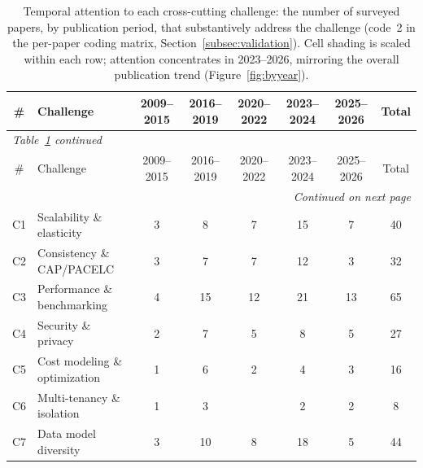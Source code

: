 \documentclass[a4paper,fleqn]{cas-sc}
\begin{document}
\begin{landscape}
\setlength{\LTcapwidth}{\linewidth}
\begin{small}
\begin{longtable}{c >{\raggedright\arraybackslash}p{4.6cm} *{5}{c} c}
\caption{Temporal attention to each cross-cutting challenge: the number of surveyed papers, by publication period, that substantively address the challenge (code~2 in the per-paper coding matrix, Section~\ref{subsec:validation}). Cell shading is scaled within each row; attention concentrates in 2023--2026, mirroring the overall publication trend (Figure~\ref{fig:byyear}).}
\label{tab:challenge-year}\\
\toprule
\# & Challenge & 2009--2015 & 2016--2019 & 2020--2022 & 2023--2024 & 2025--2026 & Total \\
\midrule
\endfirsthead
\multicolumn{8}{l}{\small\textit{Table~\ref{tab:challenge-year} continued}}\\
\toprule
\# & Challenge & 2009--2015 & 2016--2019 & 2020--2022 & 2023--2024 & 2025--2026 & Total \\
\midrule
\endhead
\midrule
\multicolumn{8}{r}{\small\textit{Continued on next page}}\\
\endfoot
\bottomrule
\endlastfoot
C1 & Scalability \& elasticity & \cellcolor{cgray!32}3 & \cellcolor{cgray!52}8 & \cellcolor{cgray!48}7 & \cellcolor{cgray!80}15 & \cellcolor{cgray!48}7 & 40 \\
C2 & Consistency \& CAP/PACELC & \cellcolor{cgray!35}3 & \cellcolor{cgray!55}7 & \cellcolor{cgray!55}7 & \cellcolor{cgray!80}12 & \cellcolor{cgray!35}3 & 32 \\
C3 & Performance \& benchmarking & \cellcolor{cgray!31}4 & \cellcolor{cgray!62}15 & \cellcolor{cgray!54}12 & \cellcolor{cgray!80}21 & \cellcolor{cgray!57}13 & 65 \\
C4 & Security \& privacy & \cellcolor{cgray!35}2 & \cellcolor{cgray!72}7 & \cellcolor{cgray!57}5 & \cellcolor{cgray!80}8 & \cellcolor{cgray!57}5 & 27 \\
C5 & Cost modeling \& optimization & \cellcolor{cgray!30}1 & \cellcolor{cgray!80}6 & \cellcolor{cgray!40}2 & \cellcolor{cgray!60}4 & \cellcolor{cgray!50}3 & 16 \\
C6 & Multi-tenancy \& isolation & \cellcolor{cgray!40}1 & \cellcolor{cgray!80}3 &   & \cellcolor{cgray!60}2 & \cellcolor{cgray!60}2 & 8 \\
C7 & Data model diversity & \cellcolor{cgray!30}3 & \cellcolor{cgray!53}10 & \cellcolor{cgray!46}8 & \cellcolor{cgray!80}18 & \cellcolor{cgray!36}5 & 44 \\

\end{longtable}
\end{small}
\end{landscape}
\end{document}
